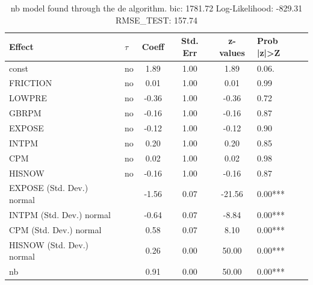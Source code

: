 \begin{table}
	\caption{nb model found through the de algorithm. bic: 1781.72 Log-Likelihood: -829.31 RMSE_TEST: 157.74}
	\begin{center}
		\begin{tabular}{|l|l|c|c|c|l|}
			\hline
			Effect & $\tau$ & Coeff & Std. Err & z-values & Prob |z|>Z \\
			\hline
			const & no & 1.89 & 1.00 & 1.89 & 0.06. \\
			\hline
			FRICTION & no & 0.01 & 1.00 & 0.01 & 0.99 \\
			\hline
			LOWPRE & no & -0.36 & 1.00 & -0.36 & 0.72 \\
			\hline
			GBRPM & no & -0.16 & 1.00 & -0.16 & 0.87 \\
			\hline
			EXPOSE & no & -0.12 & 1.00 & -0.12 & 0.90 \\
			\hline
			INTPM & no & 0.20 & 1.00 & 0.20 & 0.85 \\
			\hline
			CPM & no & 0.02 & 1.00 & 0.02 & 0.98 \\
			\hline
			HISNOW & no & -0.16 & 1.00 & -0.16 & 0.87 \\
			\hline
			EXPOSE (Std. Dev.) normal &  & -1.56 & 0.07 & -21.56 & 0.00*** \\
			\hline
			INTPM (Std. Dev.) normal &  & -0.64 & 0.07 & -8.84 & 0.00*** \\
			\hline
			CPM (Std. Dev.) normal &  & 0.58 & 0.07 & 8.10 & 0.00*** \\
			\hline
			HISNOW (Std. Dev.) normal &  & 0.26 & 0.00 & 50.00 & 0.00*** \\
			\hline
			nb &  & 0.91 & 0.00 & 50.00 & 0.00*** \\
			\hline
		\end{tabular}
	\end{center}
\end{table}